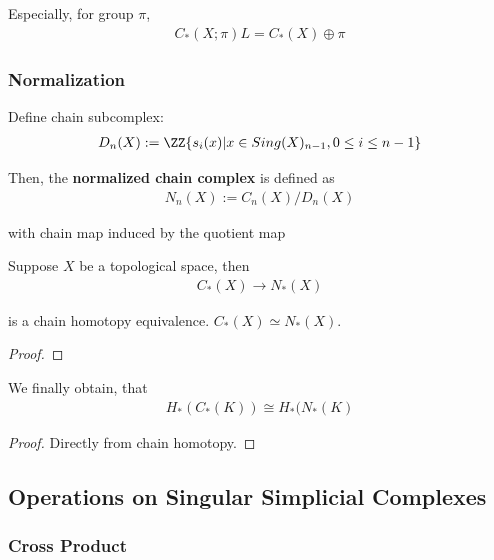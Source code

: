 \documentclass[Total.tex]{subfiles}
\begin{document}
				Especially, for group $\pi$,
				\begin{gather*}
					C_*(X;\pi)L=C_*(X)\oplus \pi
				\end{gather*}

			\subsubsection{Normalization}
				\begin{Def}
					Define chain subcomplex:
					\begin{gather*}
						D_n(X):=\ZZ\{s_i(x)|x\in Sing(X)_{n-1},0\leq i\leq n-1\}
					\end{gather*}

					Then, the \textbf{normalized chain complex} is defined as
					\begin{gather*}
						N_n(X):=C_n(X)/D_n(X)
					\end{gather*}

					with chain map induced by the quotient map
				\end{Def}

				\begin{proposition}
					Suppose $X$ be a topological space, then
					\begin{gather*}
						C_*(X)\rightarrow N_*(X)
					\end{gather*}

					is a chain homotopy equivalence. $C_*(X)\simeq N_*(X)$.
				\end{proposition}
				\begin{proof}
					
				\end{proof}

				\begin{corollary}
					We finally obtain, that
					\begin{gather*}
						H_*(C_*(K))\cong H_*(N_*(K)
					\end{gather*}
				\end{corollary}
				\begin{proof}
					Directly from chain homotopy. 
				\end{proof}
			
			\subsection{Operations on Singular Simplicial Complexes}
				\subsubsection{Cross Product}
					\begin{Def}
						
					\end{Def}
\end{document}
